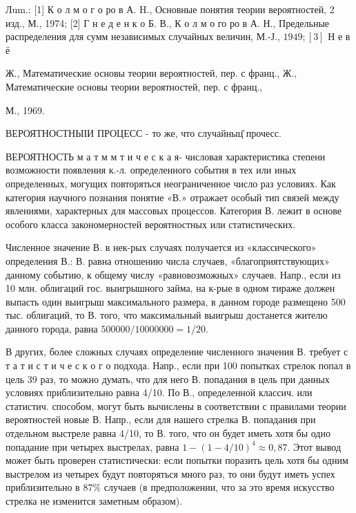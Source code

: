 \documentclass[10pt]{article}
\begin{document}
Лum.: [1] К о л м о г о ро в А. H., Основные понятия теории вероятностей, 2 изд., М., 1974; [2] Г н е д е н к о Б. В., К о л м о го ро в А. Н., Предельные распределения для сумм независимых случайных величин, М.-Ј., $1949 ;[3]$ Н е в ё

Ж., Математические основы теории вероятностей, пер. с франц., Ж., Математические основы теории вероятностей, пер. с франц.,

М., 1969.



ВЕРОЯТНОСТНЫІИ ПРОЦЕСС - то же, что случайныц̆ прочесс.



ВЕРОЯТНОСТЬ м а т м м т и ч е с к а я- числовая характеристика степени возможности появления к.-л. определенного события в тех или иных определенных, могущих повторяться неограниченное число раз условиях. Как категория научного познания понятие «В.» отражает особый тип связей между явлениями, характерных для массовых процессов. Категория В. лежит в основе особого класса закономерностей вероятностных или статистических.



Численное значение В. в нек-рых случаях получается из «классического» определения В.: В. равна отношению числа случаев, «благоприятствующих» данному событию, к общему числу «равновозможных» случаев. Напр., если из 10 млн. облигаций гос. выигрышного займа, на к-рые в одном тираже должен выпасть один выигрыш максимального размера, в данном городе размещено 500 тыс. облигаций, то В. того, что максимальный выигрыш достанется жителю данного города, равна $500000 / 10000000=1 / 20$.



В других, более сложных случаях определение численного значения В. требует с т а т и с т и ч е с к о г о подхода. Напр., если при 100 попытках стрелок попал в цель 39 раз, то можно думать, что для него В. попадания в цель при данных условиях приблизительно равна 4/10. По В., определенной классич. или статистич. способом, могут быть вычислены в соответствии с правилами теории вероятностей новые В. Напр., если для нашего стрелка В. попадания при отдельном выстреле равна 4/10, то В. того, что он будет иметь хотя бы одно попадание при четырех выстрелах, равна $1-(1-4 / 10)^{4} \approx 0,87$. Этот вывод может быть проверен статистически: если попытки поразить цель хотя бы одним выстрелом из четырех будут повторяться много раз, то они будут иметь успех приблизительно в $87 \%$ случаев (в предположении, что за это время искусство стрелка не изменится заметным образом).
\end{document}
